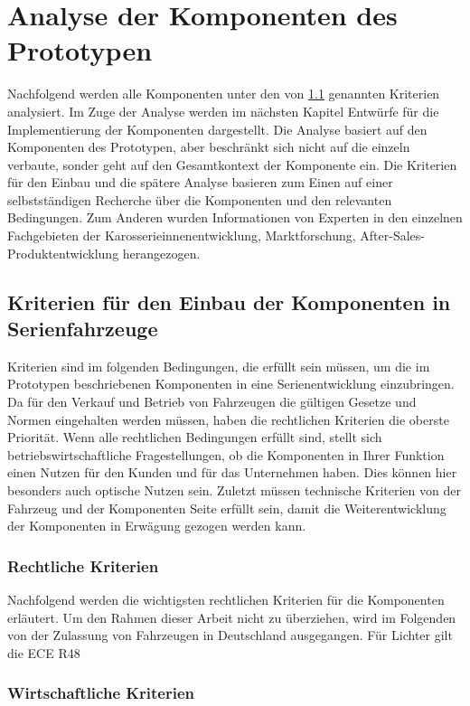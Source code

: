 \chapter{Analyse der Komponenten des Prototypen}
\label{cha:Analyse}
Nachfolgend werden alle Komponenten unter den von \ref{cha:Kriterien} genannten Kriterien analysiert. Im Zuge der Analyse werden im nächsten Kapitel Entwürfe für die Implementierung der Komponenten dargestellt. Die Analyse basiert auf den Komponenten des Prototypen, aber beschränkt sich nicht auf die einzeln verbaute, sonder geht auf den Gesamtkontext der Komponente ein.
Die Kriterien für den Einbau und die spätere Analyse basieren zum Einen auf einer selbstständigen Recherche über die Komponenten und den relevanten Bedingungen. Zum Anderen wurden Informationen von Experten in den einzelnen Fachgebieten der Karosserieinnenentwicklung, Marktforschung, After-Sales-Produktentwicklung herangezogen.
\section{Kriterien für den Einbau der Komponenten in Serienfahrzeuge}
\label{cha:Kriterien}
Kriterien sind im folgenden Bedingungen, die erfüllt sein müssen, um die im Prototypen beschriebenen Komponenten in eine Serienentwicklung einzubringen.\\
Da für den Verkauf und Betrieb von Fahrzeugen die gültigen Gesetze und Normen eingehalten werden müssen, haben die rechtlichen Kriterien die oberste Priorität. Wenn alle rechtlichen Bedingungen erfüllt sind, stellt sich betriebswirtschaftliche Fragestellungen, ob die Komponenten in Ihrer Funktion einen Nutzen für den Kunden und für das Unternehmen haben. Dies können hier besonders auch optische Nutzen sein. Zuletzt müssen technische Kriterien von der Fahrzeug und der Komponenten Seite erfüllt sein, damit die Weiterentwicklung der Komponenten in Erwägung gezogen werden kann.
\subsection{Rechtliche Kriterien}
Nachfolgend werden die wichtigsten rechtlichen Kriterien für die Komponenten erläutert. Um den Rahmen dieser Arbeit nicht zu überziehen, wird im Folgenden von der Zulassung von Fahrzeugen in Deutschland ausgegangen.
Für Lichter gilt die ECE R48
\subsection{Wirtschaftliche Kriterien}

